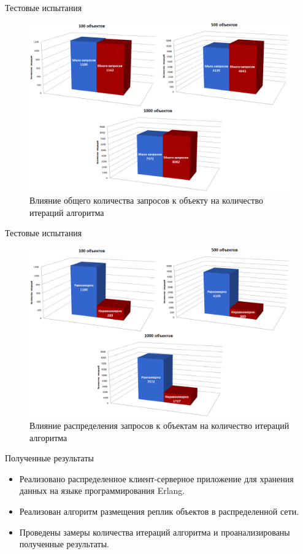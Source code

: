 \documentclass{beamer}
\begin{document}
\begin{frame}[fragile]{Тестовые испытания}
	\begin{figure}
		\includegraphics[scale=0.2]{img/histograms/req.png}
		\caption{Влияние общего количества запросов к объекту на количество итераций алгоритма}
	\end{figure}
\end{frame}

\begin{frame}[fragile]{Тестовые испытания}
	\begin{figure}
		\includegraphics[scale=0.2]{img/histograms/dist.png}
		\caption{Влияние распределения запросов к объектам на количество итераций алгоритма}
	\end{figure}
\end{frame}




\begin{frame}{Полученные результаты}
	\begin{itemize}
		\item Реализовано распределенное клиент-серверное приложение для хранения данных на языке программирования Erlang. 
    	\item Реализован алгоритм размещения реплик объектов в распределенной сети. 
    	\item Проведены замеры количества итераций алгоритма и проанализированы полученные результаты.
	\end{itemize}
\end{frame}
\end{document}
